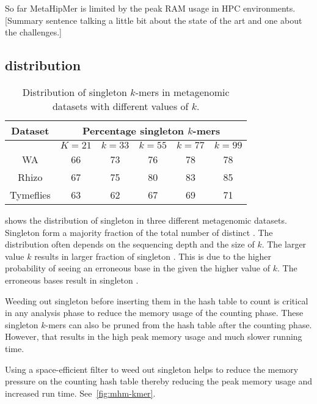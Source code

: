 \begin{rproblem}
So far MetaHipMer is limited by the peak RAM usage in HPC environments.
[Summary sentence talking a little bit about the state of the art and one about the challenges.]
\label{rprob:peppermint}
\end{rproblem}



\subsection{\Kmer distribution}

\begin{wraptable}{r}{4.5in}
\centering
    \begin{tabular}{c | c | c | c | c | c}
    \toprule
    {\bf Dataset} & \multicolumn{5}{c}{\bf Percentage singleton $k$-mers} \\
    \midrule
    & $K=21$ & $k=33$ & $k=55$ & $k=77$ & $k=99$ \\
    \midrule
    WA &  66 & 73 & 76 & 78 & 78  \\
    Rhizo &  67 & 75 & 80 & 83 & 85  \\
    Tymeflies & 63 & 62 & 67 & 69 & 71 \\
    \bottomrule
    \end{tabular}
    \caption{Distribution of singleton $k$-mers in metagenomic datasets with different values of $k$.}
    \label{tab:kmer-dist}
\end{wraptable}

 shows the distribution of singleton \kmers in three
different metagenomic datasets. Singleton \kmers form a majority fraction of
the total number of distinct \kmers. The distribution often depends on the
sequencing depth and the size of $k$. The larger value $k$ results in larger
fraction of singleton \kmers. This is due to the higher probability of seeing
an erroneous base in the \kmer given the higher value of $k$. The erroneous
bases result in singleton \kmers.

Weeding out singleton \kmers before inserting them in the hash table to count
is critical in any \kmer analysis phase to reduce the memory usage of the
counting phase. These singleton $k$-mers can also be pruned from the hash table
after the counting phase. However, that results in the high peak memory usage
and much slower running time.

Using a space-efficient filter to weed out singleton \kmers helps to reduce
the memory pressure on the counting hash table thereby reducing the peak memory
usage and increased run time. See~\cref{fig:mhm-kmer}.


